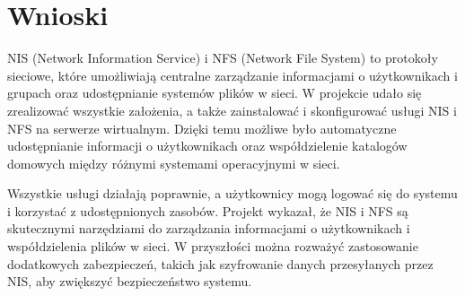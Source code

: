 	\newpage
\section{Wnioski}	%


NIS (Network Information Service) i NFS (Network File System) to protokoły sieciowe, które umożliwiają centralne zarządzanie informacjami o użytkownikach i grupach oraz udostępnianie systemów plików w sieci. W projekcie udało się zrealizować wszystkie założenia, a także zainstalować i skonfigurować usługi NIS i NFS na serwerze wirtualnym. Dzięki temu możliwe było automatyczne udostępnianie informacji o użytkownikach oraz współdzielenie katalogów domowych między różnymi systemami operacyjnymi w sieci.

Wszystkie usługi działają poprawnie, a użytkownicy mogą logować się do systemu i korzystać z udostępnionych zasobów. Projekt wykazał, że NIS i NFS są skutecznymi narzędziami do zarządzania informacjami o użytkownikach i współdzielenia plików w sieci. W przyszłości można rozważyć zastosowanie dodatkowych zabezpieczeń, takich jak szyfrowanie danych przesyłanych przez NIS, aby zwiększyć bezpieczeństwo systemu.

